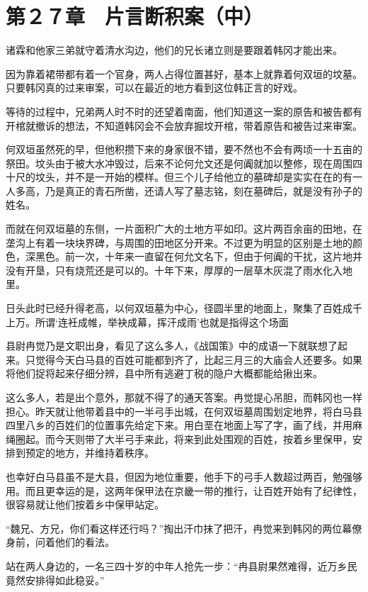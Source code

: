 \section{第２７章　片言断积案（中）}

诸霖和他家三弟就守着清水沟边，他们的兄长诸立则是要跟着韩冈才能出来。

因为靠着裙带都有着一个官身，两人占得位置甚好，基本上就靠着何双垣的坟墓。只要韩冈真的过来审案，可以在最近的地方看到这位韩正言的好戏。

等待的过程中，兄弟两人时不时的还望着南面，他们知道这一案的原告和被告都有开棺就撤诉的想法，不知道韩冈会不会放弃掘坟开棺，带着原告和被告过来审案。

何双垣虽然死的早，但他积攒下来的身家很不错，要不然也不会有两顷一十五亩的祭田。坟头由于被大水冲毁过，后来不论何允文还是何阗就加以整修，现在周围四十尺的坟头，并不是一开始的模样。但三个儿子给他立的墓碑却是实实在在的有一人多高，乃是真正的青石所凿，还请人写了墓志铭，刻在墓碑后，就是没有孙子的姓名。

而就在何双垣墓的东侧，一片面积广大的土地方平如印。这片两百余亩的田地，在垄沟上有着一块块界碑，与周围的田地区分开来。不过更为明显的区别是土地的颜色，深黑色。前一次，十年来一直留在何允文名下，但由于何阗的干扰，这片地并没有开垦，只有烧荒还是可以的。十年下来，厚厚的一层草木灰混了雨水化入地里。

日头此时已经升得老高，以何双垣墓为中心，径圆半里的地面上，聚集了百姓成千上万。所谓‘连衽成帷，举袂成幕，挥汗成雨’也就是指得这个场面

县尉冉觉乃是文职出身，看见了这么多人，《战国策》中的成语一下就联想了起来。只觉得今天白马县的百姓可能都到齐了，比起三月三的大庙会人还要多。如果将他们捉将起来仔细分辨，县中所有逃避丁税的隐户大概都能给揪出来。

这么多人，若是出个意外，那就不得了的通天答案。冉觉提心吊胆，而韩冈也一样担心。昨天就让他带着县中的一半弓手出城，在何双垣墓周围划定地界，将白马县四里八乡的百姓们的位置事先给定下来。用白垩在地面上写了字，画了线，并用麻绳圈起。而今天则带了大半弓手来此，将来到此处围观的百姓，按着乡里保甲，安排到预定的地方，并维持着秩序。

也幸好白马县虽不是大县，但因为地位重要，他手下的弓手人数超过两百，勉强够用。而且更幸运的是，这两年保甲法在京畿一带的推行，让百姓开始有了纪律性，很容易就让他们按着乡中保甲站定。

“魏兄、方兄，你们看这样还行吗？”掏出汗巾抹了把汗，冉觉来到韩冈的两位幕僚身前，问着他们的看法。

站在两人身边的，一名三四十岁的中年人抢先一步：“冉县尉果然难得，近万乡民竟然安排得如此稳妥。”

